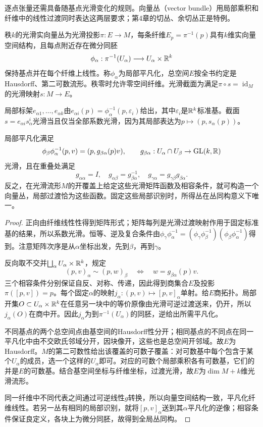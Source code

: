 逐点张量还需具备随基点光滑变化的规则。向量丛（vector bundle）用局部乘积和纤维中的线性过渡同时表达这两层要求；第4章的切丛、余切丛正是特例。
\begin{definition}[光滑实向量丛]
秩$k$的光滑实向量丛为光滑投影$\pi:E\to M$，每条纤维$E_p=\pi^{-1}(p)$具有$k$维实向量空间结构，且每点附近存在微分同胚
\[
 \phi_\alpha:\pi^{-1}(U_\alpha)\longrightarrow U_\alpha\times\mathbb{R}^k
\]
保持基点并在每个纤维上线性。称$\phi_\alpha$为局部平凡化，总空间$E$按全书约定是Hausdorff、第二可数流形。秩零时允许零空间纤维。光滑截面为满足$\pi\circ s=\operatorname{id}_M$的光滑映射$s:M\to E$。
\end{definition}
局部标架$e_{\alpha1},\ldots,e_{\alpha k}$由$e_{\alpha i}(p)=\phi_\alpha^{-1}(p,\varepsilon_i)$给出，其中$\varepsilon_i$是$\mathbb{R}^k$标准基。截面$s=e_{\alpha i}s_\alpha^i$光滑当且仅当全部系数光滑，因为其局部表达为$p\mapsto(p,s_\alpha(p))$。
\begin{theorem}[过渡函数与拼接构造]\label{thm:bundle-gluing}
局部平凡化满足
\[
 \phi_\beta\phi_\alpha^{-1}(p,v)=(p,g_{\beta\alpha}(p)v),
 \qquad g_{\beta\alpha}:U_\alpha\cap U_\beta\to\operatorname{GL}(k,\mathbb{R})
\]
光滑，且在重叠处满足
\[
 g_{\alpha\alpha}=I,\quad g_{\alpha\beta}=g_{\beta\alpha}^{-1},\quad
 g_{\gamma\alpha}=g_{\gamma\beta}g_{\beta\alpha}.
\]
反之，在光滑流形$M$的开覆盖上给定这些光滑矩阵函数及相容条件，就可构造一个向量丛，局部过渡恰为这些函数。固定这些局部识别时，所得丛在丛同构意义下唯一。
\end{theorem}
\begin{proof}
正向由纤维线性性得到矩阵形式；矩阵每列是光滑过渡映射作用于固定标准基的结果，所以系数光滑。恒等、逆及复合条件由$\phi_\gamma\phi_\alpha^{-1}=(\phi_\gamma\phi_\beta^{-1})(\phi_\beta\phi_\alpha^{-1})$得到。注意矩阵次序是从$\alpha$坐标出发，先到$\beta$，再到$\gamma$。

反向取不交并$\bigsqcup_\alpha U_\alpha\times\mathbb{R}^k$，规定
\[
 (p,v)_\alpha\sim(p,w)_\beta\quad\Longleftrightarrow\quad
 w=g_{\beta\alpha}(p)v.
\]
三个相容条件分别保证自反、对称、传递，因此得到商集合$E$及投影$\pi([p,v])=p$。每个固定$\alpha$的映射$j_\alpha:(p,v)\mapsto[p,v]_\alpha$单射。给$E$商拓扑。局部开集$O\subset U_\alpha\times\mathbb{R}^k$在任意另一块中的等价原像由光滑可逆过渡送来，仍开，所以$j_\alpha(O)$在商中开。因此$j_\alpha$为到$\pi^{-1}(U_\alpha)$的同胚，逆给出所需平凡化。

不同基点的两个总空间点由基空间的Hausdorff性分开；相同基点的不同点在同一平凡化中由不交欧氏邻域分开，因块像开，这些也是总空间开邻域。故$E$为Hausdorff。$M$的第二可数性给出该覆盖的可数子覆盖：对可数基中每个包含于某个$U_\alpha$的成员，选一个这样的$U_\alpha$即可。对应的可数个局部乘积各有可数基，它们的并是$E$的可数基。结合基空间坐标与纤维坐标，过渡光滑，故$E$为$\dim M+k$维光滑流形。

同一纤维中不同代表之间通过可逆线性$g$转换，所以向量空间结构一致，平凡化纤维线性。若另一丛有相同的局部识别，就将$[p,v]_\alpha$送到其$\alpha$平凡化的逆像；相容条件保证良定义，各块上为微分同胚，故得到全局丛同构。
\end{proof}
